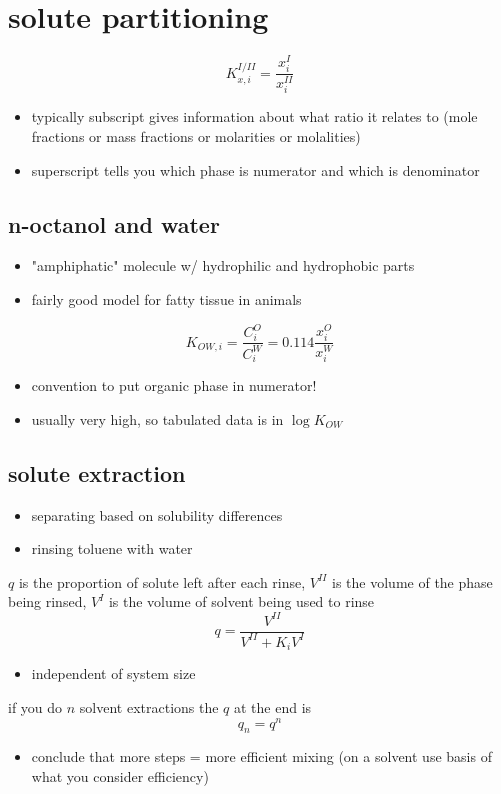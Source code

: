 \documentclass{article}
\begin{document}
\section*{solute partitioning}
\[
K_{x,i}^{I/II} = \frac{x_{i}^{I}}{x_{i}^{II}}
\]
\begin{itemize}
    \item typically subscript gives information about what ratio it relates to (mole fractions or mass fractions or molarities or molalities)
    \item superscript tells you which phase is numerator and which is denominator
\end{itemize}
\subsection*{n-octanol and water}
\begin{itemize}
    \item "amphiphatic" molecule w/ hydrophilic and hydrophobic parts
    \item fairly good model for fatty tissue in animals
\end{itemize}
\[
K_{OW,i} = \frac{C^{O}_{i}}{C^{W}_{i}} = 0.114 \frac{x_{i}^{O}}{x^{W}_{i}}
\]
\begin{itemize}
    \item convention to put organic phase in numerator!
    \item usually very high, so tabulated data is in $\log K_{OW}$
\end{itemize}

\subsection*{solute extraction}
\begin{itemize}
    \item separating based on solubility differences
    \item rinsing toluene with water
\end{itemize}
$q$ is the proportion of solute left after each rinse, $V^{II}$ is the volume of the phase being rinsed, $V^{I}$ is the volume of solvent being used to rinse
\[
q = \frac{V^{II}}{V^{II} + K_{i}V^{I}}
\]
\begin{itemize}
    \item independent of system size
\end{itemize}
if you do $n$ solvent extractions the $q$ at the end is
\[
q_{n} = q^{n}
\]
\begin{itemize}
    \item conclude that more steps = more efficient mixing (on a solvent use basis of what you consider efficiency)
\end{itemize}
\end{document}
